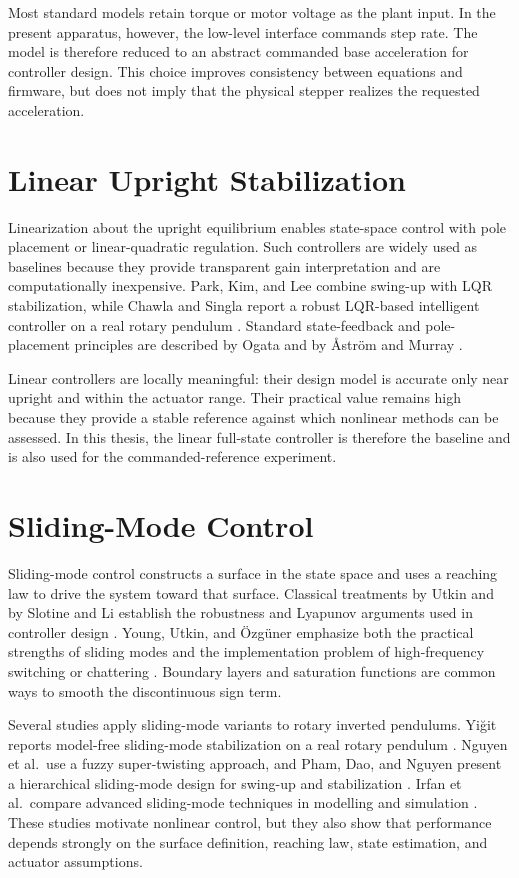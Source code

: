 Most standard models retain torque or motor voltage as the plant input. In the
present apparatus, however, the low-level interface commands step rate. The
model is therefore reduced to an abstract commanded base acceleration for
controller design. This choice improves consistency between equations and
firmware, but does not imply that the physical stepper realizes the requested
acceleration.

\section{Linear Upright Stabilization}
Linearization about the upright equilibrium enables state-space control with
pole placement or linear-quadratic regulation. Such controllers are widely
used as baselines because they provide transparent gain interpretation and
are computationally inexpensive. Park, Kim, and Lee combine swing-up with LQR
stabilization, while Chawla and Singla report a robust LQR-based intelligent
controller on a real rotary pendulum \cite{Park2011,Chawla2018}. Standard
state-feedback and pole-placement principles are described by Ogata and by
{\AA}str{\"o}m and Murray \cite{ogata_modern_control,Astrom2008}.

Linear controllers are locally meaningful: their design model is accurate
only near upright and within the actuator range. Their practical value remains
high because they provide a stable reference against which nonlinear methods
can be assessed. In this thesis, the linear full-state controller is therefore
the baseline and is also used for the commanded-reference experiment.

\section{Sliding-Mode Control}
Sliding-mode control constructs a surface in the state space and uses a
reaching law to drive the system toward that surface. Classical treatments by
Utkin and by Slotine and Li establish the robustness and Lyapunov arguments
used in controller design \cite{utkin1992,slotine1991}. Young, Utkin, and
\"{O}zg\"{u}ner emphasize both the practical strengths of sliding modes and the
implementation problem of high-frequency switching or chattering
\cite{Young1999}. Boundary layers and saturation functions are common ways to
smooth the discontinuous sign term.

Several studies apply sliding-mode variants to rotary inverted pendulums.
Yi\u{g}it reports model-free sliding-mode stabilization on a real rotary
pendulum \cite{Yigit2017}. Nguyen et al.\ use a fuzzy super-twisting approach,
and Pham, Dao, and Nguyen present a hierarchical sliding-mode design for
swing-up and stabilization \cite{Nguyen2020,Pham2024}. Irfan et al.\ compare
advanced sliding-mode techniques in modelling and simulation
\cite{Irfan2018}. These studies motivate nonlinear control, but they also show
that performance depends strongly on the surface definition, reaching law,
state estimation, and actuator assumptions.

